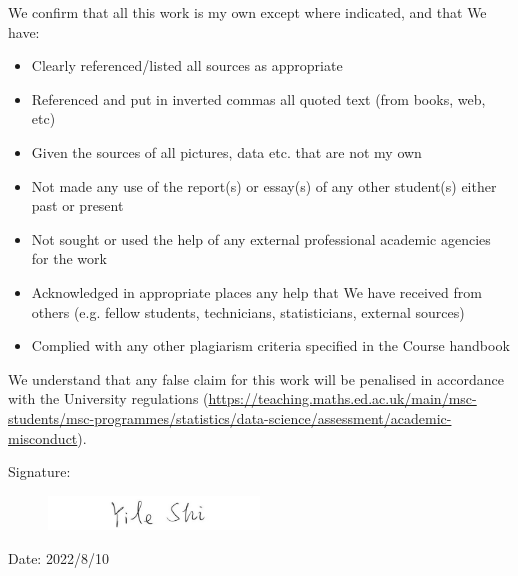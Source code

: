 \documentclass[11pt,twoside]{article}
\numberwithin{Theorem}{section}
\numberwithin{Definition}{section}
\numberwithin{Lemma}{section}
\numberwithin{Algorithm}{section}
\numberwithin{equation}{section}
\begin{document}
\vspace{1cm}

We confirm that all this work is my own except where indicated, and that We have:
\begin{itemize}
\item	Clearly referenced/listed all sources as appropriate	 				
\item	Referenced and put in inverted commas all quoted text (from books, web, etc)	
\item	Given the sources of all pictures, data etc. that are not my own				
\item	Not made any use of the report(s) or essay(s) of any other student(s) either past 	
or present	
\item	Not sought or used the help of any external professional academic agencies for the work
\item	Acknowledged in appropriate places any help that We have received from others	(e.g. fellow students, technicians, statisticians, external sources)
\item	Complied with any other plagiarism criteria specified in the Course handbook
\end{itemize}

We understand that any false claim for this work will be penalised in accordance with
the University regulations	(\url{https://teaching.maths.ed.ac.uk/main/msc-students/msc-programmes/statistics/data-science/assessment/academic-misconduct}).								

\vspace{1cm}

Signature:

\begin{figure}[!h]
	\includegraphics[width = 0.5\textwidth]{Images/Signature.png}
\end{figure}

\vspace{5mm}

Date: 2022/8/10

\clearpage


\pagestyle{plain}
\setcounter{page}{1}
\end{document}
